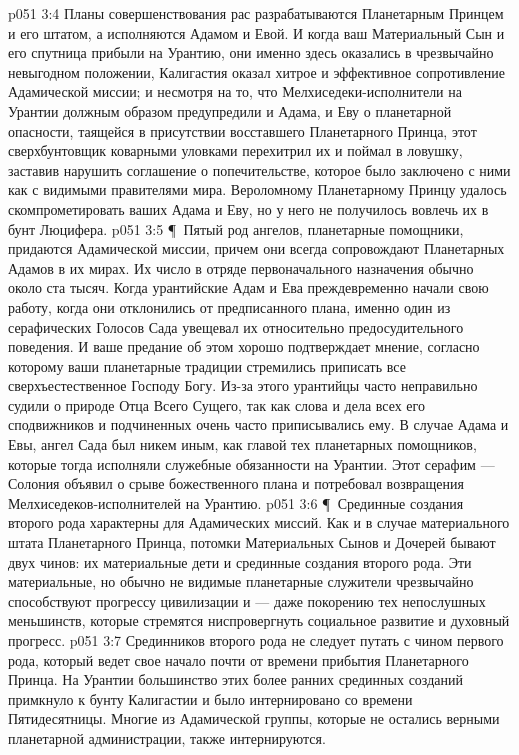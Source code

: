 \vs p051 3:4 Планы совершенствования рас разрабатываются Планетарным Принцем и его штатом, а исполняются Адамом и Евой. И когда ваш Материальный Сын и его спутница прибыли на Урантию, они именно здесь оказались в чрезвычайно невыгодном положении, Калигастия оказал хитрое и эффективное сопротивление Адамической миссии; и несмотря на то, что Мелхиседеки\hyp{}исполнители на Урантии должным образом предупредили и Адама, и Еву о планетарной опасности, таящейся в присутствии восставшего Планетарного Принца, этот сверхбунтовщик коварными уловками перехитрил их и поймал в ловушку, заставив нарушить соглашение о попечительстве, которое было заключено с ними как с видимыми правителями мира. Вероломному Планетарному Принцу удалось скомпрометировать ваших Адама и Еву, но у него не получилось вовлечь их в бунт Люцифера.
\vs p051 3:5 \P\ Пятый род ангелов, планетарные помощники, придаются Адамической миссии, причем они всегда сопровождают Планетарных Адамов в их мирах. Их число в отряде первоначального назначения обычно около ста тысяч. Когда урантийские Адам и Ева преждевременно начали свою работу, когда они отклонились от предписанного плана, именно один из серафических Голосов Сада увещевал их относительно предосудительного поведения. И ваше предание об этом хорошо подтверждает мнение, согласно которому ваши планетарные традиции стремились приписать все сверхъестественное Господу Богу. Из\hyp{}за этого урантийцы часто неправильно судили о природе Отца Всего Сущего, так как слова и дела всех его сподвижников и подчиненных очень часто приписывались ему. В случае Адама и Евы, ангел Сада был никем иным, как главой тех планетарных помощников, которые тогда исполняли служебные обязанности на Урантии. Этот серафим --- Солония объявил о срыве божественного плана и потребовал возвращения Мелхиседеков\hyp{}исполнителей на Урантию.
\vs p051 3:6 \P\ Срединные создания второго рода характерны для Адамических миссий. Как и в случае материального штата Планетарного Принца, потомки Материальных Сынов и Дочерей бывают двух чинов: их материальные дети и срединные создания второго рода. Эти материальные, но обычно не видимые планетарные служители чрезвычайно способствуют прогрессу цивилизации и --- даже покорению тех непослушных меньшинств, которые стремятся ниспровергнуть социальное развитие и духовный прогресс.
\vs p051 3:7 Срединников второго рода не следует путать с чином первого рода, который ведет свое начало почти от времени прибытия Планетарного Принца. На Урантии большинство этих более ранних срединных созданий примкнуло к бунту Калигастии и было интернировано со времени Пятидесятницы. Многие из Адамической группы, которые не остались верными планетарной администрации, также интернируются.
